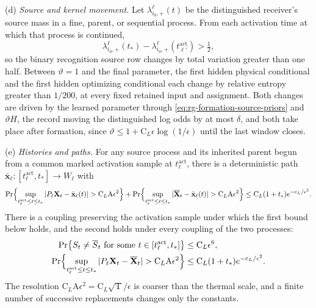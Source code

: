 (d) \emph{Source and kernel movement.} Let \(\lambda^\ell_{i_0,+}(t)\) be the
distinguished receiver's source mass in a fine, parent, or sequential process.
From each activation time at which that process is continued,
\begin{equation}
\lambda^\ell_{i_0,+}(t_*)-
  \lambda^\ell_{i_0,+}(t^{\mathrm{act}}_{\ell'})>\tfrac12,
\label{eq:rg-formation-source-movement}
\end{equation}
so the binary recognition source row changes by total variation greater than
one half. Between \(\vartheta=1\) and the final parameter, the first hidden
physical conditional and the first hidden optimizing conditional each change
by relative entropy greater than \(1/200\), at every fixed retained input and
assignment. Both changes are driven by the learned parameter through
\cref{eq:rg-formation-source-priors} and \(\vartheta H\), the record moving
the distinguished log odds by at most \(\delta\), and both take place after
formation, since \(\vartheta\le1+\mathrm C_L\epsilon\log(1/\epsilon)\) until
the last window closes.

(e) \emph{Histories and paths.} For any source process and its inherited
parent begun from a common marked activation sample at
\(t^{\mathrm{act}}_\ell\), there is a deterministic path
\(\bar{\mathbf x}_\ell:[t^{\mathrm{act}}_\ell,t_*]\to W_\ell\) with
\begin{equation}
\Pr\Bigl\{\sup_{t^{\mathrm{act}}_\ell\le t\le t_*}|P_\ell\mathbf X_t-\bar{\mathbf x}_\ell(t)|
  >\mathrm C_L\mathrm A\epsilon^2\Bigr\}
+\Pr\Bigl\{\sup_{t^{\mathrm{act}}_\ell\le t\le t_*}|\overline{\mathbf X}_t-\bar{\mathbf x}_\ell(t)|
  >\mathrm C_L\mathrm A\epsilon^2\Bigr\}
\le\mathrm C_L(1+t_*)e^{-\mathrm c_L/\epsilon^2}.
\label{eq:rg-formation-common-path-concentration}
\end{equation}
There is a coupling preserving the activation sample under which the first
bound below holds, and the second holds under every coupling of the two
processes:
\begin{equation}
\begin{aligned}
\Pr\bigl\{S_t\ne\overline S_t
       \text{ for some }t\in[t^{\mathrm{act}}_\ell,t_*]\bigr\}
 &\le\mathrm C_L\epsilon^6,\\
\Pr\Bigl\{\sup_{t^{\mathrm{act}}_\ell\le t\le t_*}
       |P_\ell\mathbf X_t-\overline{\mathbf X}_t|>\mathrm C_L\mathrm A\epsilon^2\Bigr\}
 &\le\mathrm C_L(1+t_*)e^{-\mathrm c_L/\epsilon^2}.
\end{aligned}
\label{eq:rg-formation-two-path-bounds}
\end{equation}
The resolution
\(\mathrm C_L\mathrm A\epsilon^2=\mathrm C_L\sqrt{\mathrm T}/\epsilon\) is
coarser than the thermal scale, and a finite number of successive
replacements changes only the constants. 

